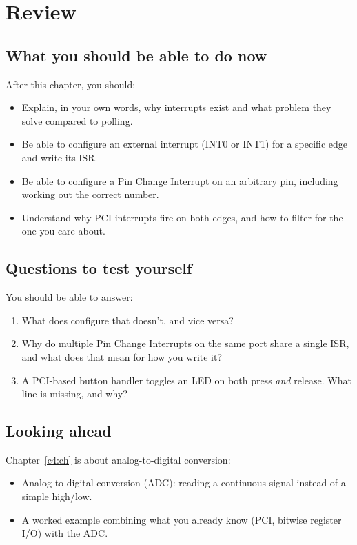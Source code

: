 
\section{Review}
\label{c3:sec:review}

\subsection*{What you should be able to do now}
After this chapter, you should:
\begin{itemize}
  \item Explain, in your own words, why interrupts exist and what problem they solve compared to
    polling.
  \item Be able to configure an external interrupt (INT0 or INT1) for a specific edge and write its
    ISR.
  \item Be able to configure a Pin Change Interrupt on an arbitrary pin, including working out the
    correct  number.
  \item Understand why PCI interrupts fire on both edges, and how to filter for the one you care
    about.
\end{itemize}

\subsection*{Questions to test yourself}
You should be able to answer:
\begin{enumerate}
  \item What does  configure that  doesn't, and vice versa?
  \item Why do multiple Pin Change Interrupts on the same port share a single ISR, and what does
    that mean for how you write it?
  \item A PCI-based button handler toggles an LED on both press \emph{and} release. What line is
    missing, and why?
\end{enumerate}

\subsection*{Looking ahead}
Chapter~\ref{c4:ch} is about analog-to-digital conversion:
\begin{itemize}
  \item Analog-to-digital conversion (ADC): reading a continuous signal instead of a simple
    high/low.
  \item A worked example combining what you already know (PCI, bitwise register I/O) with the ADC.
\end{itemize}
